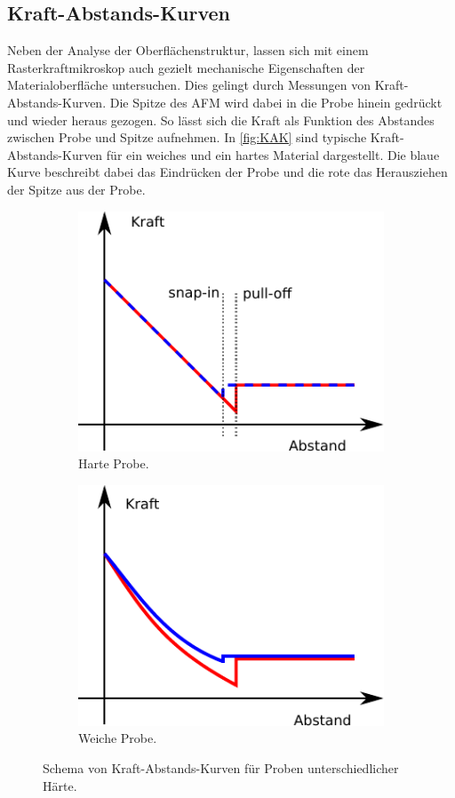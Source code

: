 \subsection{Kraft-Abstands-Kurven}
\label{sec:KAK}
Neben der Analyse der Oberflächenstruktur, lassen sich mit einem Rasterkraftmikroskop auch gezielt mechanische Eigenschaften der Materialoberfläche untersuchen. Dies gelingt durch Messungen von Kraft-Abstands-Kurven. Die Spitze des AFM wird dabei in die Probe hinein gedrückt und wieder heraus gezogen. So lässt sich die Kraft als Funktion des Abstandes zwischen Probe und Spitze aufnehmen.
In \autoref{fig:KAK} sind typische Kraft-Abstands-Kurven für ein weiches und ein hartes Material dargestellt. Die blaue Kurve beschreibt dabei das Eindrücken der Probe und die rote das Herausziehen der Spitze aus der Probe.
\begin{figure}[H]
  \centering
  \begin{subfigure}{0.45\textwidth}
    \includegraphics{content/plots/harte-theorie.pdf}
    \caption{Harte Probe.}
  \end{subfigure}
  \begin{subfigure}{0.45\textwidth}
    \includegraphics{content/plots/weiche-theorie.pdf}
    \caption{Weiche Probe.}
  \end{subfigure}
  \caption{Schema von Kraft-Abstands-Kurven für Proben unterschiedlicher Härte.}
  \label{fig:KAK}
\end{figure}
